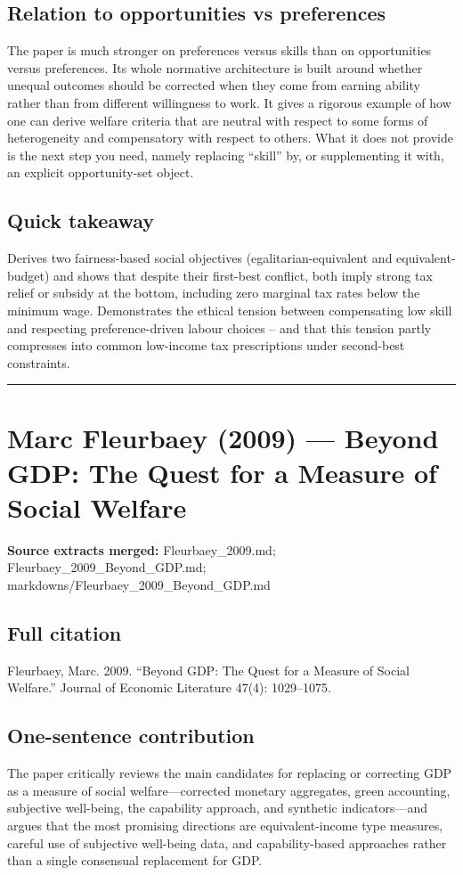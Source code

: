 \documentclass[11pt,a4paper]{article}
\begin{document}
\subsection*{Relation to opportunities vs preferences}
The paper is much stronger on preferences versus skills than on opportunities versus preferences. Its whole normative architecture is built around whether unequal outcomes should be corrected when they come from earning ability rather than from different willingness to work. It gives a rigorous example of how one can derive welfare criteria that are neutral with respect to some forms of heterogeneity and compensatory with respect to others. What it does not provide is the next step you need, namely replacing “skill” by, or supplementing it with, an explicit opportunity-set object.

\subsection*{Quick takeaway}
Derives two fairness-based social objectives (egalitarian-equivalent and equivalent-budget) and shows that despite their first-best conflict, both imply strong tax relief or subsidy at the bottom, including zero marginal tax rates below the minimum wage. Demonstrates the ethical tension between compensating low skill and respecting preference-driven labour choices -- and that this tension partly compresses into common low-income tax prescriptions under second-best constraints.


\medskip\hrule\medskip

\section*{Marc Fleurbaey (2009) — Beyond GDP: The Quest for a Measure of Social Welfare}

\textbf{Source extracts merged:} Fleurbaey\_2009.md; Fleurbaey\_2009\_Beyond\_GDP.md; markdowns/Fleurbaey\_2009\_Beyond\_GDP.md

\subsection*{Full citation}
Fleurbaey, Marc. 2009. “Beyond GDP: The Quest for a Measure of Social Welfare.” Journal of Economic Literature 47(4): 1029–1075.

\subsection*{One-sentence contribution}
The paper critically reviews the main candidates for replacing or correcting GDP as a measure of social welfare—corrected monetary aggregates, green accounting, subjective well-being, the capability approach, and synthetic indicators—and argues that the most promising directions are equivalent-income type measures, careful use of subjective well-being data, and capability-based approaches rather than a single consensual replacement for GDP.
\end{document}
